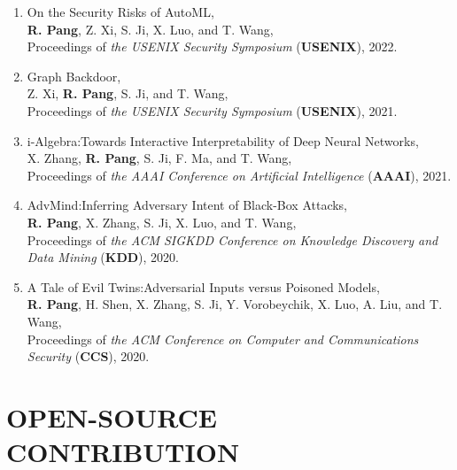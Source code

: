 \documentclass[letterpaper,11pt]{article}
\begin{document}
\begin{enumerate}[labelsep=15pt, parsep=-4pt]
    \item On the Security Risks of AutoML,\\
    \textbf{R. Pang}, Z. Xi, S. Ji, X. Luo, and T. Wang,\\
    Proceedings of {\it the USENIX Security Symposium\/} (\textbf{USENIX}), 2022.
    
    \item Graph Backdoor,\\
    Z. Xi, \textbf{R. Pang}, S. Ji, and T. Wang,\\
    Proceedings of {\it the USENIX Security Symposium\/} (\textbf{USENIX}), 2021.
    
    \item i-Algebra:\@ Towards Interactive Interpretability of Deep Neural Networks,\\
    X. Zhang, \textbf{R. Pang}, S. Ji, F. Ma, and T. Wang,\\
    Proceedings of {\it the AAAI Conference on Artificial Intelligence\/} (\textbf{AAAI}), 2021.
    
    \item AdvMind:\@ Inferring Adversary Intent of Black-Box Attacks,\\
    \textbf{R. Pang}, X. Zhang, S. Ji, X. Luo, and T. Wang,\\
    Proceedings of {\it the ACM SIGKDD Conference on Knowledge Discovery and Data Mining\/} (\textbf{KDD}), 2020.

    \item A Tale of Evil Twins:\@ Adversarial Inputs versus Poisoned Models,\\
    \textbf{R. Pang}, H. Shen, X. Zhang, S. Ji, Y. Vorobeychik, X. Luo, A. Liu, and T. Wang,\\
    Proceedings of {\it the ACM Conference on Computer and Communications Security\/} (\textbf{CCS}), 2020.

    \end{enumerate}


\section{OPEN-SOURCE CONTRIBUTION}
\end{document}
